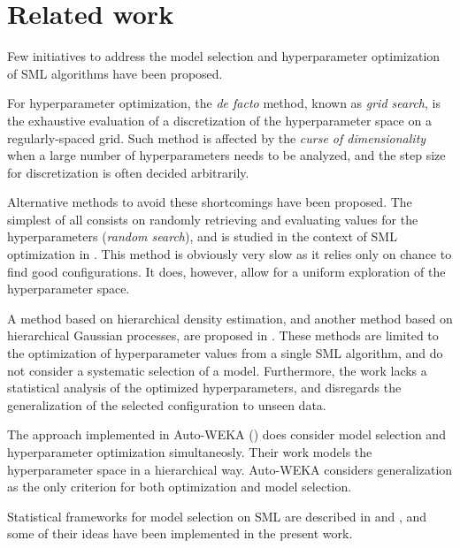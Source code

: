 	\section{Related work}

	Few initiatives to address the model selection and hyperparameter optimization of SML algorithms
	have been proposed. 

	For hyperparameter optimization, the \emph{de facto} method, known as \emph{grid search}, is the
	exhaustive evaluation of a discretization of the hyperparameter space on a regularly-spaced grid. Such method is
	affected by the \emph{curse of dimensionality} when a large number of hyperparameters needs to
	be analyzed, and the step size for discretization is often decided arbitrarily.

	Alternative methods to avoid these shortcomings have been proposed. The simplest of all consists
	on randomly retrieving and evaluating values for the hyperparameters (\emph{random search}), and
	is studied in the context of SML optimization in \cite{bergstra2012random}. This method is
	obviously very slow as it relies only on chance to find good configurations. It does, however,
	allow for a uniform exploration of the hyperparameter space.

	A method based on hierarchical density estimation, and another method based on hierarchical
	Gaussian processes, are proposed in \cite{bergstra2011hyperparameter}. These methods are limited
	to the optimization of hyperparameter values from a single SML algorithm, and do not consider a
	systematic selection of a model. Furthermore, the work lacks a statistical analysis of the
	optimized hyperparameters, and disregards the generalization of the selected configuration to
	unseen data.

	The approach implemented in Auto-WEKA (\cite{autoweka}) does consider model selection and
	hyperparameter optimization simultaneosly. Their work models the hyperparameter space in a
	hierarchical way. Auto-WEKA considers generalization as the only criterion for both optimization and
	model selection.
	
	Statistical frameworks for model selection on SML are described in \cite{pizarro2002mct} and
	\cite{demsar2006mct}, and some of their ideas have been implemented in the present work.
